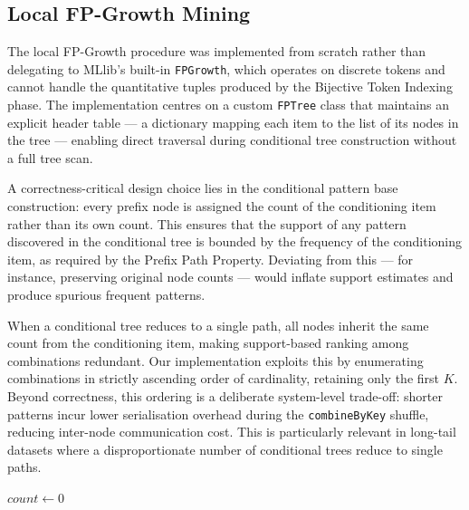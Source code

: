 \documentclass[10pt, twocolumn]{article}
\begin{document}
\subsection{Local FP-Growth Mining}

The local FP-Growth procedure was implemented from scratch rather than
delegating to MLlib's built-in \texttt{FPGrowth}, which operates on
discrete tokens and cannot handle the quantitative tuples produced by
the Bijective Token Indexing phase. The implementation centres on a
custom \texttt{FPTree} class that maintains an explicit header table —
a dictionary mapping each item to the list of its nodes in the tree —
enabling direct traversal during conditional tree construction without
a full tree scan.

A correctness-critical design choice lies in the conditional pattern
base construction: every prefix node is assigned the count of the
conditioning item rather than its own count. This ensures that the
support of any pattern discovered in the conditional tree is bounded
by the frequency of the conditioning item, as required by the Prefix
Path Property. Deviating from this — for instance, preserving original
node counts — would inflate support estimates and produce spurious
frequent patterns.

When a conditional tree reduces to a single path, all nodes inherit
the same count from the conditioning item, making support-based ranking
among combinations redundant. Our implementation exploits this by
enumerating combinations in strictly ascending order of cardinality,
retaining only the first $K$. Beyond correctness, this ordering is a
deliberate system-level trade-off: shorter patterns incur lower
serialisation overhead during the \texttt{combineByKey} shuffle,
reducing inter-node communication cost. This is particularly relevant
in long-tail datasets where a disproportionate number of conditional
trees reduce to single paths.

\begin{algorithm}[H]
    \caption{\textsc{TopKCombinations} — cardinality-ascending enumeration}

    $count \leftarrow 0$\;
\end{algorithm}
\end{document}
